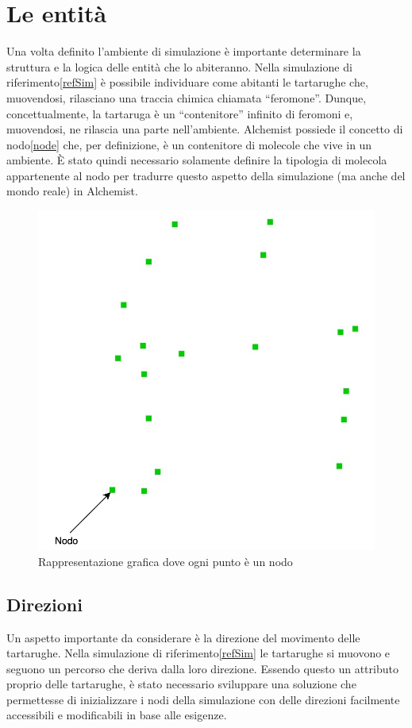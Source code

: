 \section{Le entità}
Una volta definito l'ambiente di simulazione è importante determinare la struttura e la logica delle 
entità che lo abiteranno. Nella simulazione di riferimento\space\ref{refSim} è possibile individuare come abitanti le tartarughe
che, muovendosi, rilasciano una traccia chimica chiamata ``feromone''. Dunque, concettualmente, la tartaruga è un ``contenitore'' infinito di 
feromoni e, muovendosi, ne rilascia una parte nell'ambiente. Alchemist possiede il concetto di nodo\space\ref{node} che, per definizione, 
è un contenitore di molecole che vive in un ambiente. È stato quindi necessario solamente definire la tipologia di molecola
appartenente al nodo per tradurre questo aspetto della simulazione (ma anche del mondo reale) in Alchemist.
\begin{figure}[h!]
    \centering
    \includegraphics[width=.7\linewidth]{figures/nodes.png}
    \caption{Rappresentazione grafica dove ogni punto è un nodo}\label{fig:nodes}
\end{figure}
\subsection{Direzioni}
Un aspetto importante da considerare è la direzione del movimento delle tartarughe. Nella simulazione di riferimento\space\ref{refSim} le tartarughe
si muovono e seguono un percorso che deriva dalla loro direzione. Essendo questo un attributo proprio delle tartarughe,
è stato necessario sviluppare una soluzione che permettesse di inizializzare i nodi della simulazione con delle direzioni facilmente accessibili 
e modificabili in base alle esigenze.

